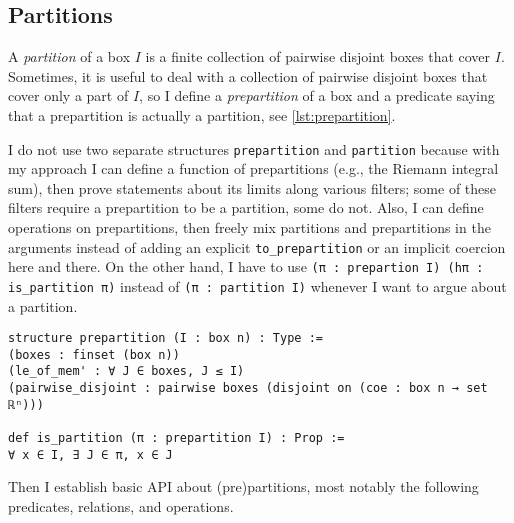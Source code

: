 \documentclass[a4paper, UKenglish,cleveref, autoref, thm-restate]{lipics-v2021}
\begin{document}
\subsection{Partitions}\label{sec:partitions}

A \emph{partition} of a box \(I\) is a finite collection of pairwise
disjoint boxes that cover \(I\). Sometimes, it is useful to deal with
a collection of pairwise disjoint boxes that cover only a part of
\(I\), so I define a \emph{prepartition} of a box and a predicate
saying that a prepartition is actually a partition, see
\autoref{lst:prepartition}.

I do not use two separate structures \lstinline=prepartition= and
\lstinline=partition= because with my approach I can define a function
of prepartitions (e.g., the Riemann integral sum), then prove
statements about its limits along various filters; some of these
filters require a prepartition to be a partition, some do not. Also, I
can define operations on prepartitions, then freely mix partitions and
prepartitions in the arguments instead of adding an explicit
\lstinline=to_prepartition= or an implicit coercion here and there.
On the other hand, I have to use
\lstinline=(π : prepartion I) (hπ : is_partition π)= instead of
\lstinline=(π : partition I)= whenever I want to argue about a
partition.

\begin{lstlisting}[caption={Definition of a (pre)partition}, label=lst:prepartition]
structure prepartition (I : box n) : Type :=
(boxes : finset (box n))
(le_of_mem' : ∀ J ∈ boxes, J ≤ I)
(pairwise_disjoint : pairwise boxes (disjoint on (coe : box n → set ℝⁿ)))

def is_partition (π : prepartition I) : Prop :=
∀ x ∈ I, ∃ J ∈ π, x ∈ J
\end{lstlisting}

Then I establish basic API about (pre)partitions, most notably the
following predicates, relations, and operations.
\end{document}
